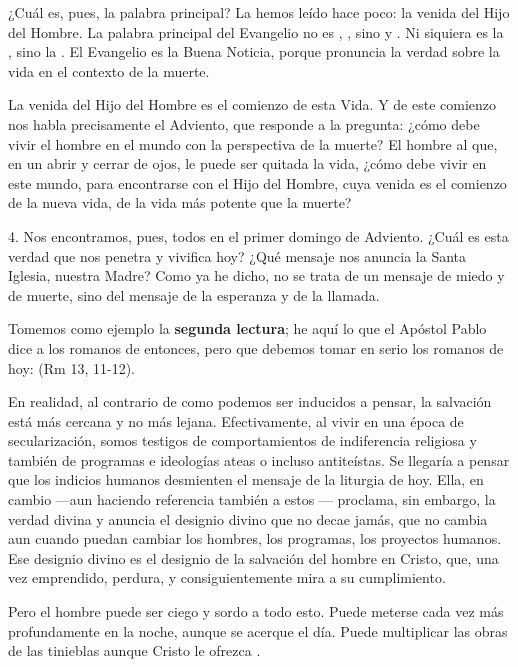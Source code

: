 ¿Cuál es, pues, la palabra principal? La hemos leído hace poco: la venida del Hijo del Hombre. La palabra principal del Evangelio no es , , sino  y . Ni siquiera es la , sino la . El Evangelio es la Buena Noticia, porque pronuncia la verdad sobre la vida en el contexto de la muerte.



La venida del Hijo del Hombre es el comienzo de esta Vida. Y de este comienzo nos habla precisamente el Adviento, que responde a la pregunta: ¿cómo debe vivir el hombre en el mundo con la perspectiva de la muerte? El hombre al que, en un abrir y cerrar de ojos, le puede ser quitada la vida, ¿cómo debe vivir en este mundo, para encontrarse con el Hijo del Hombre, cuya venida es el comienzo de la nueva vida, de la vida más potente que la muerte?

4. Nos encontramos, pues, todos en el primer domingo de Adviento. ¿Cuál es esta verdad que nos penetra y vivifica hoy? ¿Qué mensaje nos anuncia la Santa Iglesia, nuestra Madre? Como ya he dicho, no se trata de un mensaje de miedo y de muerte, sino del mensaje de la esperanza y de la llamada.

Tomemos como ejemplo la \textbf{segunda lectura}; he aquí lo que el Apóstol Pablo dice a los romanos de entonces, pero que debemos tomar en serio los romanos de hoy:  (Rm 13, 11-12).

En realidad, al contrario de como podemos ser inducidos a pensar, la salvación está más cercana y no más lejana. Efectivamente, al vivir en una época de secularización, somos testigos de comportamientos de indiferencia religiosa y también de programas e ideologías ateas o incluso antiteístas. Se llegaría a pensar que los indicios humanos desmienten el mensaje de la liturgia de hoy. Ella, en cambio ---aun haciendo referencia también a estos --- proclama, sin embargo, la verdad divina y anuncia el designio divino que no decae jamás, que no cambia aun cuando puedan cambiar los hombres, los programas, los proyectos humanos. Ese designio divino es el designio de la salvación del hombre en Cristo, que, una vez emprendido, perdura, y consiguientemente mira a su cumplimiento.

Pero el hombre puede ser ciego y sordo a todo esto. Puede meterse cada vez más profundamente en la noche, aunque se acerque el día. Puede multiplicar las obras de las tinieblas aunque Cristo le ofrezca .

